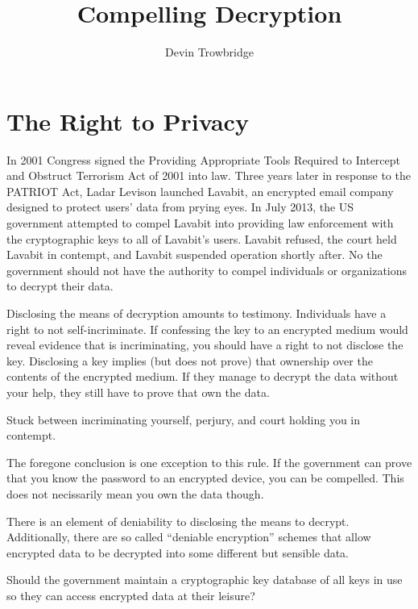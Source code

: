 \documentclass[format=sigconf]{acmart}
\title{Compelling Decryption}
\author{Devin Trowbridge}
\affiliation{%
  \department{Computer Science and Software Engineering}
  \institution{Auburn University}
  \email{dkt0003@auburn.edu}
  \city{Huntsville}
  \state{Alabama}
  \country{United States}}
\begin{document}
\maketitle

\section{The Right to Privacy}

In 2001 Congress signed the Providing Appropriate Tools Required to Intercept and Obstruct Terrorism Act of 2001 into law. Three years later in response to the PATRIOT Act, Ladar Levison launched Lavabit, an encrypted email company designed to protect users' data from prying eyes. In July 2013, the US government attempted to compel Lavabit into providing law enforcement with the cryptographic keys to all of Lavabit's users. Lavabit refused, the court held Lavabit in contempt, and Lavabit suspended operation shortly after.
No the government should not have the authority to compel individuals or organizations to decrypt their data.

Disclosing the means of decryption amounts to testimony. 
  Individuals have a right to not self-incriminate.
  If confessing the key to an encrypted medium would reveal evidence that is incriminating, you should have a right to not disclose the key.
  Disclosing a key implies (but does not prove) that ownership over the contents of the encrypted medium. If they manage to decrypt the data without your help, they still have to prove that own the data.

Stuck between incriminating yourself, perjury, and court holding you in contempt. 

The foregone conclusion is one exception to this rule.
  If the government can prove that you know the password to an encrypted device, you can be compelled. This does not necissarily mean you own the data though.
  
There is an element of deniability to disclosing the means to decrypt. Additionally, there are so called ``deniable encryption'' schemes that allow encrypted data to be decrypted into some different but sensible data. 

Should the government maintain a cryptographic key database of all keys in use so they can access encrypted data at their leisure?
  

\medskip



\end{document}
